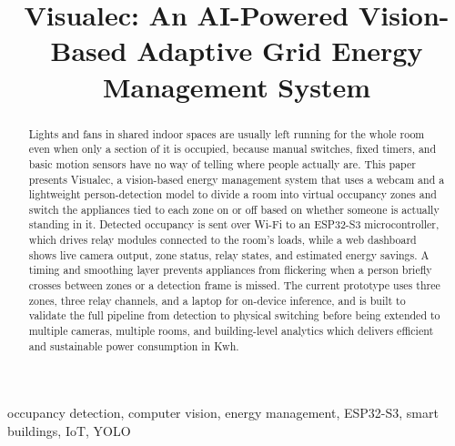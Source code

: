 \documentclass[conference]{IEEEtran}
\begin{document}
\title{Visualec: An AI-Powered Vision-Based Adaptive Grid Energy Management System}

\author{
\and
{}
}

\maketitle

\begin{abstract}
Lights and fans in shared indoor spaces are usually left running for the whole room even when only a section of it is occupied, because manual switches, fixed timers, and basic motion sensors have no way of telling where people actually are. This paper presents Visualec, a vision-based energy management system that uses a webcam and a lightweight person-detection model to divide a room into virtual occupancy zones and switch the appliances tied to each zone on or off based on whether someone is actually standing in it. Detected occupancy is sent over Wi-Fi to an ESP32-S3 microcontroller, which drives relay modules connected to the room's loads, while a web dashboard shows live camera output, zone status, relay states, and estimated energy savings. A timing and smoothing layer prevents appliances from flickering when a person briefly crosses between zones or a detection frame is missed. The current prototype uses three zones, three relay channels, and a laptop for on-device inference, and is built to validate the full pipeline from detection to physical switching before being extended to multiple cameras, multiple rooms, and building-level analytics which delivers efficient and sustainable power consumption in Kwh.
\end{abstract}

\begin{IEEEkeywords}
occupancy detection, computer vision, energy management, ESP32-S3, smart buildings, IoT, YOLO
\end{IEEEkeywords}
\end{document}
